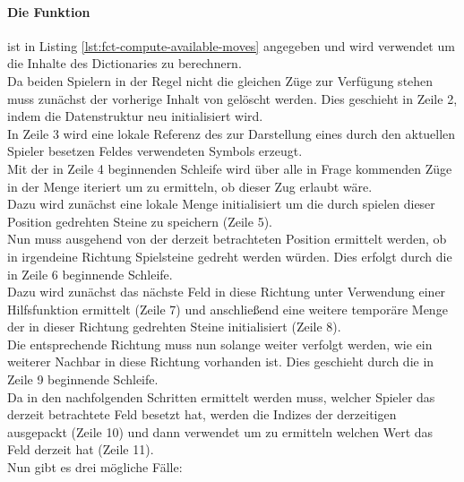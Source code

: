 \paragraph{Die Funktion }
 ist in Listing \ref{lst:fct-compute-available-moves} angegeben und wird verwendet um die Inhalte des Dictionaries  zu berechnern.
\\Da beiden Spielern in der Regel nicht die gleichen Züge zur Verfügung stehen muss zunächst der vorherige Inhalt von  gelöscht werden. Dies geschieht in Zeile 2, indem die Datenstruktur neu initialisiert wird.
\\In Zeile 3 wird eine lokale Referenz des zur Darstellung eines durch den aktuellen Spieler besetzen Feldes verwendeten Symbols erzeugt.
\\Mit der in Zeile 4 beginnenden Schleife wird über alle in Frage kommenden Züge in der Menge  iteriert um zu ermitteln, ob dieser Zug erlaubt wäre.
\\Dazu wird zunächst eine lokale Menge initialisiert um die durch spielen dieser Position gedrehten Steine zu speichern (Zeile 5).
\\Nun muss ausgehend von der derzeit betrachteten Position ermittelt werden, ob in irgendeine Richtung Spielsteine gedreht werden würden. Dies erfolgt durch die in Zeile 6 beginnende Schleife.
\\Dazu wird zunächst das nächste Feld in diese Richtung unter Verwendung einer Hilfsfunktion ermittelt (Zeile 7) und anschließend eine weitere temporäre Menge der in dieser Richtung gedrehten Steine initialisiert (Zeile 8).
\\Die entsprechende Richtung muss nun solange weiter verfolgt werden, wie ein weiterer Nachbar in diese Richtung vorhanden ist. Dies geschieht durch die in Zeile 9 beginnende Schleife.
\\Da in den nachfolgenden Schritten ermittelt werden muss, welcher Spieler das derzeit betrachtete Feld besetzt hat, werden die Indizes der derzeitigen  ausgepackt (Zeile 10) und dann verwendet um zu ermitteln welchen Wert das Feld derzeit hat (Zeile 11).
\\Nun gibt es drei mögliche Fälle:
